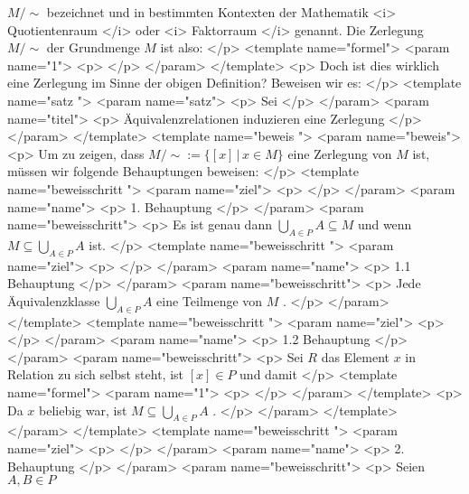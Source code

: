    ${M/{\sim}}$
   bezeichnet und in bestimmten Kontexten der Mathematik
   <i>
    Quotientenraum
   </i>
   oder
   <i>
    Faktorraum
   </i>
   genannt. Die Zerlegung
   ${M/{\sim}}$
   der Grundmenge
   $M$
   ist also:
  </p>
  <template name="formel">
   <param name="1">
    <p>
    </p>
   </param>
  </template>
  <p>
   Doch ist dies wirklich eine Zerlegung im Sinne der obigen Definition? Beweisen wir es:
  </p>
  <template name="satz
 ">
   <param name="satz">
    <p>
     Sei
    </p>
   </param>
   <param name="titel">
    <p>
     Äquivalenzrelationen induzieren eine Zerlegung
    </p>
   </param>
  </template>
  <template name="beweis
 ">
   <param name="beweis">
    <p>
     Um zu zeigen, dass
     ${M/{\sim}}:= \{ [x]\,|\,x\in M\}$
     eine Zerlegung von
     $M$
     ist, müssen wir folgende Behauptungen beweisen:
    </p>
    <template name="beweisschritt
 ">
     <param name="ziel">
      <p>
      </p>
     </param>
     <param name="name">
      <p>
       1. Behauptung
      </p>
     </param>
     <param name="beweisschritt">
      <p>
       Es ist genau dann
       $\bigcup_{A\in P} A \subseteq M$
       und wenn
       $M\subseteq \bigcup_{A\in P} A$
       ist.
      </p>
      <template name="beweisschritt
 ">
       <param name="ziel">
        <p>
        </p>
       </param>
       <param name="name">
        <p>
         1.1 Behauptung
        </p>
       </param>
       <param name="beweisschritt">
        <p>
         Jede Äquivalenzklasse
         $\bigcup_{A\in P} A$
         eine Teilmenge von
         $M$
         .
        </p>
       </param>
      </template>
      <template name="beweisschritt
 ">
       <param name="ziel">
        <p>
        </p>
       </param>
       <param name="name">
        <p>
         1.2 Behauptung
        </p>
       </param>
       <param name="beweisschritt">
        <p>
         Sei
         $R$
         das Element
         $x$
         in Relation zu sich selbst steht, ist
         $[x]\in P$
         und damit
        </p>
        <template name="formel">
         <param name="1">
          <p>
          </p>
         </param>
        </template>
        <p>
         Da
         $x$
         beliebig war, ist
         $M\subseteq \bigcup_{A\in P} A$
         .
        </p>
       </param>
      </template>
     </param>
    </template>
    <template name="beweisschritt
 ">
     <param name="ziel">
      <p>
      </p>
     </param>
     <param name="name">
      <p>
       2. Behauptung
      </p>
     </param>
     <param name="beweisschritt">
      <p>
       Seien
       $A,B\in P$
